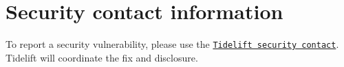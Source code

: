\chapter{Security contact information }
\hypertarget{md_gui_2node__modules_2pump_2SECURITY}{}\label{md_gui_2node__modules_2pump_2SECURITY}
\label{md_gui_2node__modules_2pump_2SECURITY_autotoc_md1185}%
%


To report a security vulnerability, please use the \href{https://tidelift.com/security}{\texttt{Tidelift security contact}}. Tidelift will coordinate the fix and disclosure. 
